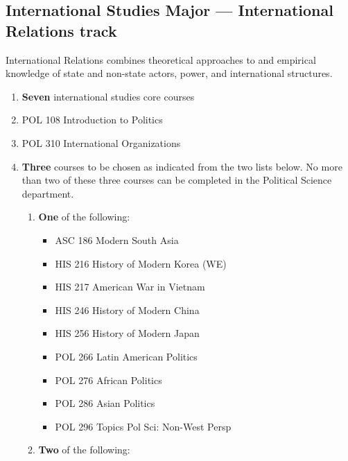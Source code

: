 \documentclass[
  letterpaper,
]{scrbook}
\providecommand{\tightlist}{%
  \setlength{\itemsep}{0pt}\setlength{\parskip}{0pt}}
\begin{document}
\subsection{International Studies Major --- International Relations
track}\label{international-studies-major-international-relations-track}

International Relations combines theoretical approaches to and empirical
knowledge of state and non-state actors, power, and international
structures.

\begin{enumerate}
\def\labelenumi{\arabic{enumi}.}
\item
  \textbf{Seven} international studies core courses
\item
  POL 108 Introduction to Politics
\item
  POL 310 International Organizations
\item
  \textbf{Three} courses to be chosen as indicated from the two lists
  below. No more than two of these three courses can be completed in the
  Political Science department.

  \begin{enumerate}
  \def\labelenumii{\alph{enumii}.}
  \tightlist
  \item
    \textbf{One} of the following:

    \begin{itemize}
    \tightlist
    \item
      ASC 186 Modern South Asia
    \item
      HIS 216 History of Modern Korea (WE)
    \item
      HIS 217 American War in Vietnam
    \item
      HIS 246 History of Modern China
    \item
      HIS 256 History of Modern Japan
    \item
      POL 266 Latin American Politics
    \item
      POL 276 African Politics
    \item
      POL 286 Asian Politics
    \item
      POL 296 Topics Pol Sci: Non-West Persp
    \end{itemize}
  \item
    \textbf{Two} of the following:


\end{enumerate}
\end{enumerate}
\end{document}
